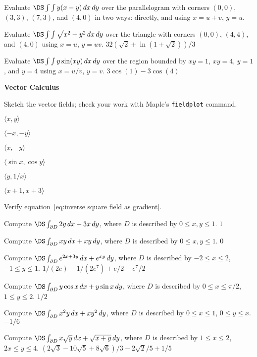 \begin{multicols}{2}
\problem Evaluate $\DS\int\int y(x-y)\,dx\,dy$ over the parallelogram %
with corners $(0,0)$, $(3,3)$, $(7,3)$, and $(4,0)$ in two ways:
directly, and using $x=u+v$, $y=u$.

\problem Evaluate $\DS\int\int \sqrt{x^2+y^2}\,dx\,dy$ over the %
triangle with corners $(0,0)$, $(4,4)$, and $(4,0)$ using $x=u$, $y=uv$.
\answer
$32(\sqrt2+\ln(1+\sqrt2))/3$
\endanswer

\problem Evaluate $\DS\int\int y\sin(xy)\,dx\,dy$ over the %
region bounded by $xy=1$, $xy=4$, $y=1$, and $y=4$ using
$x=u/v$, $y=v$.
\answer
$3\cos(1)-3\cos(4)$
\endanswer


\def\dint#1{\int\int_{#1}}
\textbf{Vector Calculus}



Sketch the vector fields; check your work with Maple's \verb|fieldplot|
command. 

\problem $\langle x,y\rangle$  %

\problem $\langle -x, -y\rangle$  %

\problem $\langle x,-y\rangle$  %

\problem $\langle \sin x,\cos y\rangle$  %

\problem $\langle y,1/x\rangle$  %

\problem $\langle x+1,x+3\rangle$  %

\problem Verify equation~\ref{eq:inverse square field as gradient}. %





\problem Compute $\DS\int_{\partial D} 2y\,dx + 3x\,dy$,  %
where $D$ is described by $0\le x,y\le 1$.
\answer
$1$
\endanswer

\problem Compute $\DS\int_{\partial D} xy\,dx + xy\,dy$,  %
where $D$ is described by $0\le x,y\le 1$.
\answer
$0$
\endanswer

\problem Compute $\DS\int_{\partial D} e^{2x+3y}\,dx + e^{xy}\,dy$,  %
where $D$ is described by $-2\le x\le 2$, $-1\le y\le 1$.
\answer
$1/(2e)-1/(2e^7)+e/2-e^7/2$
\endanswer

\problem Compute $\DS\int_{\partial D} y\cos x\,dx + y\sin x\,dy$,  %
where $D$ is described by $0\le x\le \pi/2$, $1\le y\le 2$.
\answer
$1/2$
\endanswer

\problem Compute $\DS\int_{\partial D} x^2y\,dx + xy^2\,dy$,  %
where $D$ is described by $0\le x\le 1$, $0\le y\le x$.
\answer
$-1/6$
\endanswer

\problem Compute $\DS\int_{\partial D} x\sqrt{y}\,dx + \sqrt{x+y}\,dy$,  %
where $D$ is described by $1\le x\le 2$, $2x\le y\le 4$.
\answer
$(2\sqrt3-10\sqrt5+8\sqrt6)/3-2\sqrt2/5+1/5$
\endanswer


\end{multicols}
